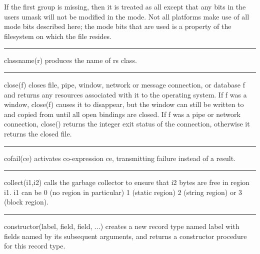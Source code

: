 If the first group is missing, then it is treated as
{\textquotedbl}all{\textquotedbl} except that any bits in the
user{\textquotesingle}s umask will not be modified in the mode. Not all
platforms make use of all mode bits described here; the mode bits that
are used is a property of the filesystem on which the file resides.

\bigskip\hrule\vspace{0.1cm}

\noindent
\textsf{classname(r)} produces the name of \textsf{r}{\textquotesingle}s
class.

\bigskip\hrule\vspace{0.1cm}

\noindent
{}\textsf{close(f)} closes file, pipe,
window, network or message connection, or database f
and returns any resources associated with it to the operating system.
If f was a window, close(f) causes it to disappear, but the window can
still be written to and copied from until all open bindings are closed.
If f was a pipe or network connection, close() returns the integer exit
status of the connection, otherwise it returns the closed file.

\bigskip\hrule\vspace{0.1cm}

\noindent
{}cofail(ce) activates
co-expression ce, transmitting failure instead of a result.

\bigskip\hrule\vspace{0.1cm}

\noindent
{}collect(i1,i2) calls the garbage collector to ensure that i2 bytes are free in region
i1. i1 can be 0 (no region in particular) 1 (static region) 2 (string
region) or 3 (block region).

\bigskip\hrule\vspace{0.1cm}

\noindent
{}constructor(label, field, field, ...) creates
a new record type named \textsf{label} with fields named by its
subsequent arguments, and returns a constructor procedure for this
record type.

